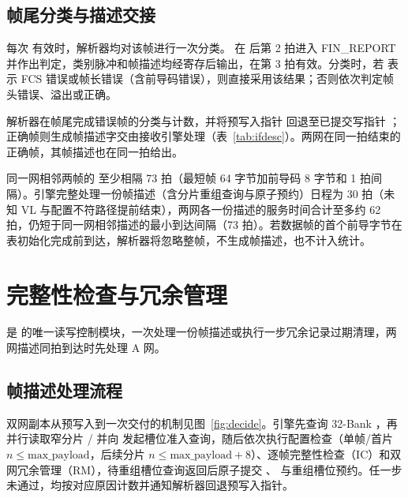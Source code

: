 \subsection{帧尾分类与描述交接}

每次  有效时，解析器均对该帧进行一次分类。 在  后第 2 拍进入 FIN\_REPORT 并作出判定，类别脉冲和帧描述均经寄存后输出，在第 3 拍有效。分类时，若  表示 FCS 错误或帧长错误（含前导码错误），则直接采用该结果；否则依次判定帧头错误、溢出或正确。

解析器在帧尾完成错误帧的分类与计数，并将预写入指针  回退至已提交写指针 ；正确帧则生成帧描述字交由接收引擎处理（表~\ref{tab:ifdesc}）。两网在同一拍结束的正确帧，其帧描述也在同一拍给出。

同一网相邻两帧的  至少相隔 73 拍（最短帧 64 字节加前导码 8 字节和 1 拍间隔）。引擎完整处理一份帧描述（含分片重组查询与原子预约）日程为 30 拍（未知 VL 与配置不符路径提前结束），两网各一份描述的服务时间合计至多约 62 拍，仍短于同一网相邻描述的最小到达间隔（73 拍）。若数据帧的首个前导字节在表初始化完成前到达，解析器将忽略整帧，不生成帧描述，也不计入统计。

\section{完整性检查与冗余管理}

 是  的唯一读写控制模块，一次处理一份帧描述或执行一步冗余记录过期清理，两网描述同拍到达时先处理 A 网。

\subsection{帧描述处理流程}

双网副本从预写入到一次交付的机制见图~\ref{fig:decide}。引擎先查询 32-Bank ，再并行读取窄分片 / 并向  发起槽位准入查询，随后依次执行配置检查（单帧/首片 $n \le \text{max\_payload}$，后续分片 $n \le \text{max\_payload}+8$）、逐帧完整性检查（IC）和双网冗余管理（RM），待重组槽位查询返回后原子提交 、 与重组槽位预约。任一步未通过，均按对应原因计数并通知解析器回退预写入指针。


